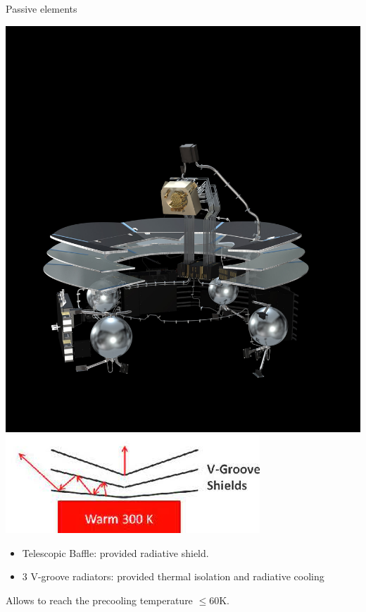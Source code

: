 \documentclass{cubeamer}
\begin{document}
\begin{frame}{Passive elements}

    \begin{minipage}{0.3\textwidth}
    \includegraphics[width=0.9\linewidth]{Figures/vgroves.jpg} \\
    \includegraphics[width=0.9\linewidth]{Figures/V-groove_radiators.jpg}
    \end{minipage}
    \begin{minipage}{0.65\textwidth}

   
         \begin{itemize}
         \item Telescopic Baffle: provided radiative shield.
         \item 3 V-groove radiators: provided  thermal isolation and radiative cooling
         \end{itemize}
         Allows to reach the precooling temperature $\leq60$K.
    \end{minipage}
\end{frame}
\end{document}
